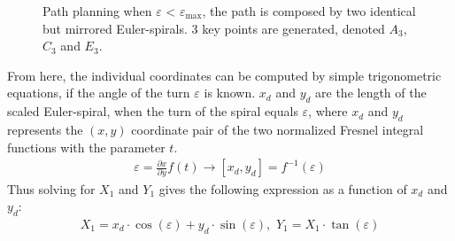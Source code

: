 \documentclass[a0,portrait]{a0poster}
\begin{document}
\begin{center}
{\begin{figure}
\begin{center}
		\caption{Path planning when $\varepsilon$ < $\varepsilon_\text{max}$, the path is composed by two identical but mirrored Euler-spirals. 3 key points are generated, denoted $A_3$, $C_3$ and $E_3$.}
		\label{fig:3points}
	\end{center}
\end{figure}
From here, the individual coordinates can be computed by simple trigonometric equations, if the angle of the turn $\varepsilon$ is known. $x_d$ and $y_d$ are the length of the scaled Euler-spiral, when the turn of the spiral equals $\varepsilon$, where $x_d$ and $y_d$ represents the $(x,y)$ coordinate pair of the two normalized Fresnel integral functions with the parameter $t$.
\begin{align}
\varepsilon = \frac{\partial x}{\partial y}f(t) \to [x_d,y_d] = f^{-1}(\varepsilon)
\end{align}
Thus solving for $X_1$ and $Y_1$ gives the following expression as a function of $x_d$ and $y_d$:
\begin{align}
X_1 = x_d \cdot \cos(\varepsilon) + y_d \cdot \sin(\varepsilon),\,\, Y_1 = X_1 \cdot \tan(\varepsilon)
\end{align}

}
\col{
}
\end{center}
\end{document}
